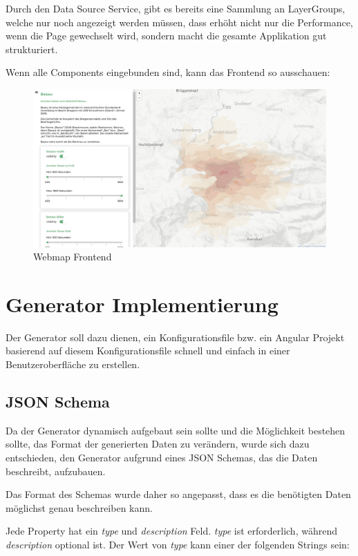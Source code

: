 Durch den Data Source Service, gibt es bereits eine Sammlung an LayerGroups, welche nur noch angezeigt werden müssen,
dass erhöht nicht nur die Performance, wenn die Page gewechselt wird, sondern macht die gesamte Applikation gut strukturiert.

Wenn alle Components eingebunden sind, kann das Frontend so ausschauen:
\begin{figure}[hbt!]
    \centering
    \includegraphics[scale=.3]{pics/webmap-frontend}
    \caption{Webmap Frontend}
    \label{fig:webmap-frontend}
\end{figure}


\section{Generator Implementierung}
Der Generator soll dazu dienen, ein Konfigurationsfile bzw. ein Angular Projekt basierend auf diesem Konfigurationsfile
schnell und einfach in einer Benutzeroberfläche zu erstellen.


\subsection{JSON Schema}
Da der Generator dynamisch aufgebaut sein sollte und die Möglichkeit bestehen sollte, das Format der generierten
Daten zu verändern, wurde sich dazu entschieden, den Generator aufgrund eines JSON Schemas, das die Daten beschreibt,
aufzubauen.

Das Format des Schemas wurde daher so angepasst, dass es die benötigten Daten möglichst genau beschreiben kann.

Jede Property hat ein \textit{type} und \textit{description} Feld.
\textit{type} ist erforderlich, während \textit{description} optional ist.
Der Wert von \textit{type} kann einer der folgenden Strings sein:

